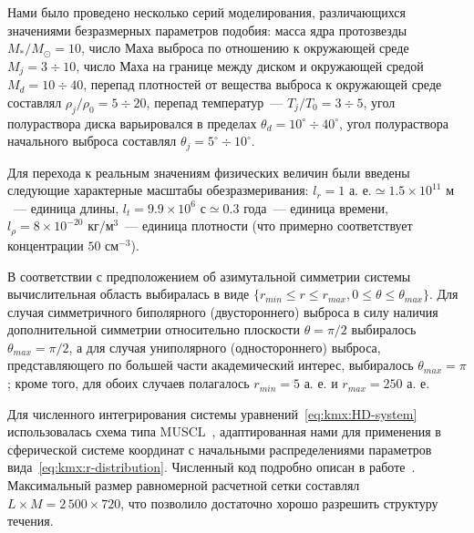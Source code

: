 Нами было проведено несколько серий моделирования, различающихся
значениями безразмерных параметров подобия: масса ядра протозвезды
${M_* / M_\odot = 10}$, число Маха выброса по отношению к окружающей
среде ${M_j = 3 \div 10}$, число Маха на границе между диском
и окружающей средой ${M_d = 10 \div 40}$, перепад плотностей от
вещества выброса к окружающей среде составлял
${\rho_j/\rho_0 = 5 \div 20}$, перепад температур~---
${T_j / T_0 = 3 \div 5}$, угол полураствора диска варьировался
в пределах ${\theta_d = 10^\circ \div 40^\circ}$, угол полураствора
начального выброса составлял ${\theta_j = 5^\circ \div 10^\circ}$.

Для перехода к реальным значениям физических величин были
введены следующие характерные масштабы обезразмеривания:
${l_r = 1\text{ а. е.} \simeq 1.5 \times 10^{11}\text{ м}}$~---
единица длины,
${l_t = 9.9 \times 10^6\text{ с} \simeq 0.3\text{ года}}$~---
единица времени,
${l_\rho = 8 \times 10^{-20}\text{ кг/м$^3$}}$~---
единица плотности (что примерно соответствует концентрации
${50\text{ см}^{-3}}$).

В соответствии с предположением об азимутальной симметрии
системы вычислительная область выбиралась в виде
${\{r_{min} \leq r \leq r_{max}, 0 \leq \theta \leq \theta_{max}\}}$.
Для случая симметричного биполярного (двустороннего) выброса
в силу наличия дополнительной симметрии относительно плоскости
${\theta = \pi/2}$ выбиралось ${\theta_{max} = \pi/2}$, а для
случая униполярного (одностороннего) выброса, представляющего
по большей части академический интерес, выбиралось
${\theta_{max} = \pi}$; кроме того, для обоих случаев
полагалось ${r_{min} = 5\text{ а. е.}}$ и
${r_{max} = 250\text{ а. е.}}$

Для численного интегрирования системы уравнений~\eqref{eq:kmx:HD-system}
использовалась схема типа MUSCL~\cite{kmx:muscl}, адаптированная
нами для применения в сферической системе координат с начальными
распределениями параметров вида~\eqref{eq:kmx:r-distribution}.
Численный код подробно описан в работе~\cite{kmx:kuzmin-etal-2007}.
Максимальный размер равномерной расчетной сетки составлял
${L \times M = 2\,500 \times 720}$, что позволило достаточно хорошо
разрешить структуру течения.


